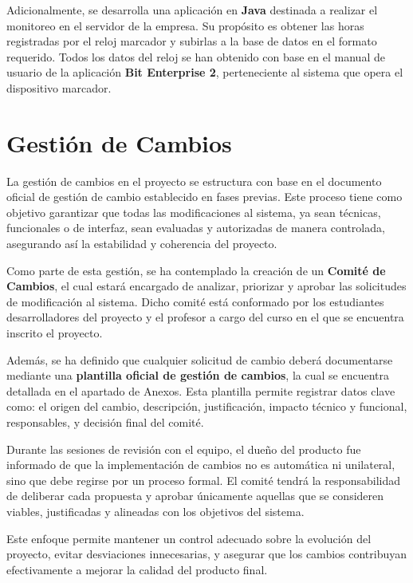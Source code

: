 Adicionalmente, se desarrolla una aplicación en \textbf{Java} destinada a realizar el monitoreo en el servidor de la empresa. Su propósito es obtener las horas registradas por el reloj marcador y subirlas a la base de datos en el formato requerido. Todos los datos del reloj se han obtenido con base en el manual de usuario de la aplicación \textbf{Bit Enterprise 2}, perteneciente al sistema que opera el dispositivo marcador.



\section{Gestión de Cambios}

La gestión de cambios en el proyecto se estructura con base en el documento oficial
de gestión de cambio establecido en fases previas. Este proceso tiene como objetivo
garantizar que todas las modificaciones al sistema, ya sean técnicas, funcionales o de
interfaz, sean evaluadas y autorizadas de manera controlada, asegurando así la estabilidad
y coherencia del proyecto.

Como parte de esta gestión, se ha contemplado la creación de un \textbf{Comité de
Cambios}, el cual estará encargado de analizar, priorizar y aprobar las solicitudes de
modificación al sistema. Dicho comité está conformado por los estudiantes desarrolladores
del proyecto y el profesor a cargo del curso en el que se encuentra inscrito el proyecto.

Además, se ha definido que cualquier solicitud de cambio deberá documentarse mediante
una \textbf{plantilla oficial de gestión de cambios}, la cual se encuentra detallada
en el apartado de Anexos. Esta plantilla permite registrar datos clave como: el origen
del cambio, descripción, justificación, impacto técnico y funcional, responsables, y
decisión final del comité.

Durante las sesiones de revisión con el equipo, el dueño del producto fue informado
de que la implementación de cambios no es automática ni unilateral, sino que debe regirse
por un proceso formal. El comité tendrá la responsabilidad de deliberar cada propuesta
y aprobar únicamente aquellas que se consideren viables, justificadas y alineadas con
los objetivos del sistema.

Este enfoque permite mantener un control adecuado sobre la evolución del proyecto,
evitar desviaciones innecesarias, y asegurar que los cambios contribuyan efectivamente
a mejorar la calidad del producto final.
